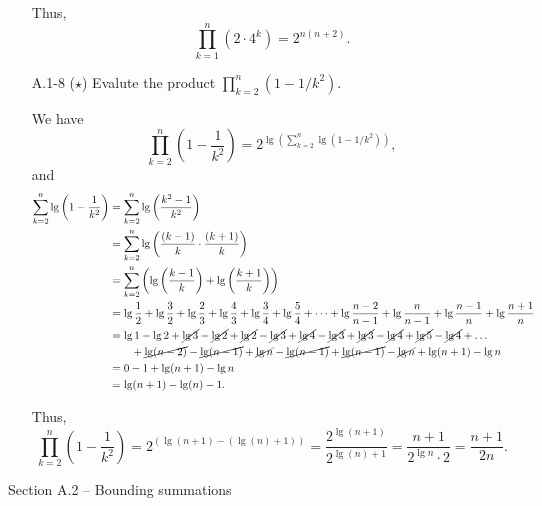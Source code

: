 \begin{enumerate}
\begin{framed}
Thus,
\[
  \prod_{k = 1}^n (2 \cdot 4^k) = 2^{n (n + 2)}.
\]
\end{framed}

\item[A.1{-}8] {($\star$) Evalute the product $\prod_{k = 2}^{n} (1 - 1/k^2)$.}

\begin{framed}
We have
\[
  \prod_{k = 2}^{n} \left(1 - \frac{1}{k^2}\right) = 2^{\lg{\left( \sum_{k = 2}^{n} \lg{(1 - 1/k^2)} \right)}},
\]
and
\begin{equation*}
\begin{aligned}
  \sum_{k = 2}^{n} \lg{\left(1 - \frac{1}{k^2}\right)}
  &= \sum_{k = 2}^{n} \lg{\left( \frac{k^2 - 1}{k^2} \right)}\\
  &= \sum_{k = 2}^{n} \lg{\left( \frac{(k - 1)}{k} \cdot \frac{(k + 1)}{k} \right)}\\
  &= \sum_{k = 2}^{n} \left( \lg \left( \frac{k - 1}{k} \right) + \lg \left( \frac{k + 1}{k} \right) \right)\\
  &= \lg{\frac{1}{2}} + \lg{\frac{3}{2}} +
     \lg{\frac{2}{3}} + \lg{\frac{4}{3}} +
     \lg{\frac{3}{4}} + \lg{\frac{5}{4}} +
     \dots +
     \lg{\frac{n - 2}{n - 1}} + \lg{\frac{n}{n - 1}} +
     \lg{\frac{n - 1}{n}} + \lg{\frac{n + 1}{n}}\\
  &= \lg 1 - \lg 2 + \cancel{\lg 3} - \cancel{\lg 2} + \cancel{\lg 2} - \cancel{\lg 3}
           + \cancel{\lg 4} - \cancel{\lg 3} + \cancel{\lg 3} - \cancel{\lg 4} + \cancel{\lg 5} - \cancel{\lg 4} + \dots\\
  & \qquad + \cancel{\lg (n - 2)} - \cancel{\lg (n - 1)} + \cancel{\lg n} - \cancel{\lg (n - 1)}
           + \cancel{\lg (n - 1)} - \cancel{\lg n} + \lg (n + 1) - \lg n\\
  &= 0 - 1 + \lg (n + 1) - \lg n\\
  &= \lg (n + 1) - \lg (n) - 1.
\end{aligned}
\end{equation*}

Thus,
\[
  \prod_{k = 2}^{n} \left(1 - \frac{1}{k^2}\right) = 2^{(\lg (n + 1) - (\lg (n) + 1))}
  = \frac{2^{\lg{(n + 1)}}}{2^{\lg{(n) + 1}}}
  = \frac{n + 1}{2^{\lg n} \cdot 2}
  = \frac{n + 1}{2n}.
\]
\end{framed}

\end{enumerate}

\newpage

{\large Section A.2 {--} Bounding summations}

